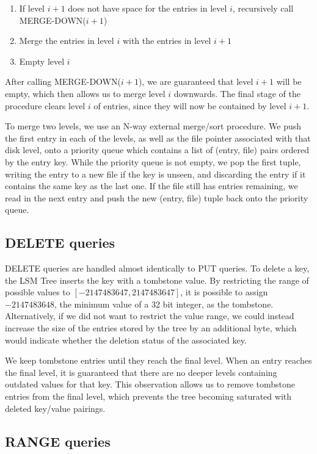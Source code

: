 \documentclass{acm}
\begin{document}
\begin{enumerate}
  \item If level $i+1$ does not have space for the entries in level $i$, recursively call MERGE-DOWN($i+1$)
  \item Merge the entries in level $i$ with the entries in level $i+1$
  \item Empty level $i$
\end{enumerate}

After calling MERGE-DOWN($i+1$), we are guaranteed that level $i+1$ will be empty, which then allows us to merge level $i$ downwards. The final stage of the procedure clears level $i$ of entries, since they will now be contained by level $i+1$.

To merge two levels, we use an N-way external merge/sort procedure. We push the first entry in each of the levels, as well as the file pointer associated with that disk level, onto a priority queue which contains a list of (entry, file) pairs ordered by the entry key. While the priority queue is not empty, we pop the first tuple, writing the entry to a new file if the key is unseen, and discarding the entry if it contains the same key as the last one. If the file still has entries remaining, we read in the next entry and push the new (entry, file) tuple back onto the priority queue.

\subsection{DELETE queries}

DELETE queries are handled almost identically to PUT queries. To delete a key, the LSM Tree inserts the key with a tombstone value. By restricting the range of possible values to $[-2147483647, 2147483647]$, it is possible to assign $-2147483648$, the minimum value of a 32 bit integer, as the tombstone. Alternatively, if we did not want to restrict the value range, we could instead increase the size of the entries stored by the tree by an additional byte, which would indicate whether the deletion status of the associated key.

We keep tombstone entries until they reach the final level. When an entry reaches the final level, it is guaranteed that there are no deeper levels containing outdated values for that key. This observation allows us to remove tombstone entries from the final level, which prevents the tree becoming saturated with deleted key/value pairings.

\subsection{RANGE queries}
\end{document}

